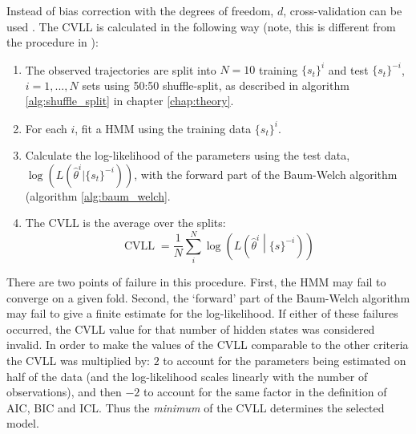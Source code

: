 Instead of bias correction with the degrees of freedom, $d$, cross-validation can be used  \cite{celeuxSelectingHiddenMarkov2008}. The CVLL is calculated in the following way (note, this is different from the procedure in \cite{celeuxSelectingHiddenMarkov2008}): 
\begin{enumerate}
    \item The observed trajectories are split into $N = 10$ training $\{s_t\}^{i}$ and test $\{s_t\}^{-i}$, $i = 1, ..., N$ sets using 50:50 shuffle-split, as described in algorithm \ref{alg:shuffle_split} in chapter \ref{chap:theory}. 
    \item For each $i$, fit a HMM using the training data $\{s_t\}^{i}$. \label{} 
    \item Calculate the log-likelihood of the parameters using the test data,  $\log{\left(L(\hat{\theta}^{i}|\{s_t\}^{-i})\right)}$, with the forward part of the Baum-Welch algorithm (algorithm \ref{alg:baum_welch}. 
    \item The CVLL is the average over the splits: 
    \begin{equation}
        \operatorname{CVLL} = \frac{1}{N}\sum_{i}^{N}\log{\left(L\left(\hat{\theta}^{i} \middle | \{s\}^{-i}\right)\right)}
    \end{equation}
\end{enumerate}
There are two points of failure in this procedure. First, the HMM may fail to converge on a given fold. Second, the `forward' part of the Baum-Welch algorithm may fail to give a finite estimate for the log-likelihood. If either of these failures occurred, the CVLL value for that number of hidden states was considered invalid.  In order to make the values of the CVLL comparable to the other criteria the CVLL was multiplied by: $2$ to account for the parameters being estimated on half of the data (and the log-likelihood scales linearly with the number of observations), and then $-2$ to account for the same factor in the definition of AIC, BIC and ICL. Thus the \emph{minimum} of the CVLL determines the selected model.

